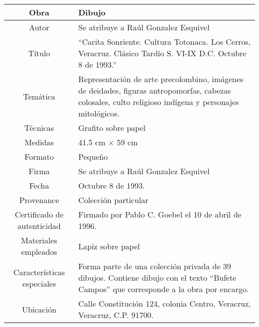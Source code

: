 \begin{table}[H]
\centering
\begin{tabular}{|c|m{}|}
\hline
Obra& Dibujo	\\
\hline
Autor & Se atribuye a Ra\'ul Gonzalez Esquivel\\
\hline
T\'itulo &``Carita Sonriente. Cultura Totonaca. Los Cerros, Veracruz. Cl\'asico Tard\'io S. VI-IX D.C. Octubre 8 de 1993.'' \\
\hline
Tem\'atica & Representaci\'on de arte precolombino, im\'agenes de deidades, figuras antropomorfas, cabezas colosales, culto religioso ind\'igena y personajes mitol\'ogicos.\\
\hline
T\'ecnicas &Grafito sobre papel \\
\hline
Medidas & 41.5 cm $\times$ 59 cm \\
\hline
 Formato & Peque\~no \\
 \hline
 Firma & Se atribuye a Ra\'ul Gonzalez Esquivel\\ 
 \hline
  Fecha & Octubre 8 de 1993.\\
 \hline
 Provenance & Colecci\'on particular\\
 \hline
 Certificado de autenticidad& Firmado por Pablo C. Goebel el 10 de abril de 1996.  \\
 \hline 
  Materiales empleados & Lapiz sobre papel\\
 \hline
 Caracter\'isticas especiales & Forma parte de una colecci\'on privada de 39 dibujos. 
Contiene dibujo con el texto ``Bufete Campos'' que corresponde a la obra por encargo. \\
\hline 
Ubicaci\'on & Calle Constituci\'on 124, colonia Centro, Veracruz, Veracruz, C.P. 91700.\\
\hline

\end{tabular}
\end{table}


